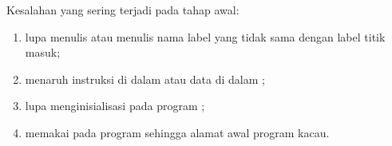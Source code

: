 \begin{peringatanbox}
\vspace{1.1em}
Kesalahan yang sering terjadi pada tahap awal:
\begin{enumerate}
    \item lupa menulis  atau menulis nama label yang tidak
          sama dengan label titik masuk;
    \item menaruh instruksi di dalam  atau data di dalam
          ;
    \item lupa menginisialisasi  pada program ;
    \item memakai  pada program  sehingga
          alamat awal program kacau.
\end{enumerate}
\end{peringatanbox}

